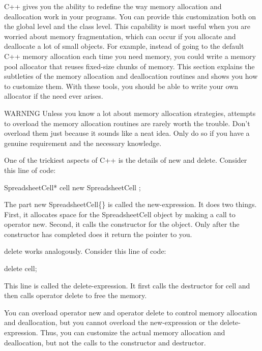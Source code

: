 
C++ gives you the ability to redefine the way memory allocation and deallocation work in your programs. You can provide this customization both on the global level and the class level. This capability is most useful when you are worried about memory fragmentation, which can occur if you allocate and deallocate a lot of small objects. For example, instead of going to the default C++ memory allocation each time you need memory, you could write a memory pool allocator that reuses fixed-size chunks of memory. This section explains the subtleties of the memory allocation and deallocation routines and shows you how to customize them. With these tools, you should be able to write your own allocator if the need ever arises.

\begin{myWarning}{WARNING}
Unless you know a lot about memory allocation strategies, attempts to overload the memory allocation routines are rarely worth the trouble. Don’t overload them just because it sounds like a neat idea. Only do so if you have a genuine requirement and the necessary knowledge.
\end{myWarning}


One of the trickiest aspects of C++ is the details of new and delete. Consider this line of code:

\begin{cpp}
SpreadsheetCell* cell { new SpreadsheetCell {} };
\end{cpp}

The part new SpreadsheetCell\{\} is called the new-expression. It does two things. First, it allocates space for the SpreadsheetCell object by making a call to operator new. Second, it calls the constructor for the object. Only after the constructor has completed does it return the pointer to you.

delete works analogously. Consider this line of code:

\begin{cpp}
delete cell;
\end{cpp}

This line is called the delete-expression. It first calls the destructor for cell and then calls operator delete to free the memory.

You can overload operator new and operator delete to control memory allocation and deallocation, but you cannot overload the new-expression or the delete-expression. Thus, you can customize the actual memory allocation and deallocation, but not the calls to the constructor and destructor.

